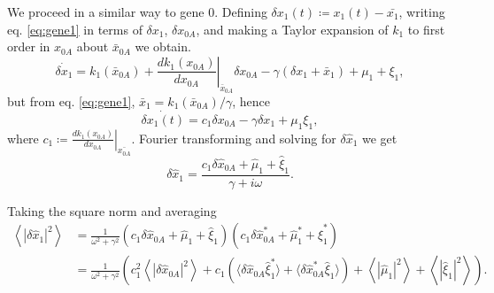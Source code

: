 We proceed in a similar way to gene $0$. Defining $\delta x_1(t) \coloneqq x_1(t) - \bar{x_1}$, writing eq. \eqref{eq:gene1} in terms of $\delta x_1$, $\delta x_{0A}$, and making a Taylor expansion of $k_1$ to first order in $x_{0A}$ about $\bar{x}_{0A}$ we obtain.
\begin{equation*}
\dot{\delta x_1} = k_1(\bar{x}_{0A}) + \left.\frac{dk_1(x_{0A})}{dx_{0A}}\right|_{\bar{x}_{0A}}\delta x_{0A} - \gamma(\delta x_1 + \bar{x}_1) + \mu_1 + \xi_1,
\end{equation*}
but from eq. \eqref{eq:gene1}, $\bar{x}_1 = k_1(\bar{x}_{0A})/\gamma$, hence
\begin{equation*}
  \dot{\delta{x_1}(t)}=c_1\delta x_{0A}-\gamma\delta x_1 + \mu_1 \xi_1,
\end{equation*}
where $c_1 \coloneqq \left.\frac{dk_1(x_{0A})}{dx_{0A}}\right|_{\bar{x_{0A}}}$. Fourier transforming and solving for $\delta \hat{x}_1$ we get
\begin{equation*}
  \delta \hat{x}_1=\frac{c_1\delta \hat{x}_{0A}+\hat{\mu}_1+\hat{\xi}_1}{\gamma + i\omega}.
\end{equation*}

Taking the square norm and averaging
\begin{equation}
  \label{eq:pgene1}
  \begin{split}
    \left\langle|\delta \hat{x}_1|^2\right\rangle &= \frac{1}{\omega^2+\gamma^2}\left(c_1\delta \hat{x}_{0A} + \hat{\mu}_1 + \hat{\xi}_1\right)\left(c_1\delta \hat{x}_{0A}^* + \hat{\mu}_1^* + \hat{\xi}_1^*\right)\\
    &=\frac{1}{\omega^2+\gamma^2}\left(c_1^2 \left\langle|\delta \hat{x}_{0A}|^2\right\rangle + c_1\left(\langle\delta \hat{x}_{0A}\hat{\xi}_1^*\rangle+\langle\delta \hat{x}_{0A}^*\hat{\xi}_1\rangle\right) +  \left\langle|\hat{\mu}_1|^2\right\rangle +  \left\langle|\hat{\xi}_1|^2\right\rangle\right).
  \end{split}
\end{equation}

